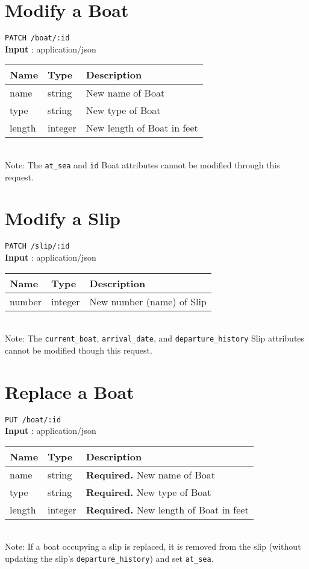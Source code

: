 \documentclass{article}
\begin{document}
\section*{Modify a Boat}
\texttt{PATCH /boat/:id} \\
\textbf{Input} : application/json \\
\begin{tabular}{| l | l | l |}
	\hline
	\textbf{Name} & \textbf{Type} & \textbf{Description} \\
	\hline
	name          & string        & New name of Boat \\
	\hline
	type          & string        & New type of Boat \\
	\hline
	length        & integer       & New length of Boat in feet \\
	\hline
\end{tabular}
\\
Note: The \texttt{at\_sea} and \texttt{id} Boat attributes cannot be modified through this request.

\section*{Modify a Slip}
\texttt{PATCH /slip/:id} \\
\textbf{Input} : application/json \\
\begin{tabular}{| l | l | l |}
	\hline
	\textbf{Name} & \textbf{Type} & \textbf{Description} \\
	\hline
	number        & integer        & New number (name) of Slip \\
	\hline
\end{tabular}
\\
Note: The \texttt{current\_boat}, \texttt{arrival\_date}, and \texttt{departure\_history} 
Slip attributes cannot be modified though this request.

\section*{Replace a Boat}
\texttt{PUT /boat/:id} \\
\textbf{Input} : application/json \\
\begin{tabular}{| l | l | l |}
	\hline
	\textbf{Name} & \textbf{Type} & \textbf{Description} \\
	\hline
	name          & string        & \textbf{Required.} New name of Boat \\
	\hline
	type          & string        & \textbf{Required.} New type of Boat \\
	\hline
	length        & integer       & \textbf{Required.} New length of Boat in feet \\
	\hline
\end{tabular}
\\
Note: If a boat occupying a slip is replaced, it is removed from the slip (without updating
the slip's \texttt{departure\_history}) and set \texttt{at\_sea}.
\end{document}
